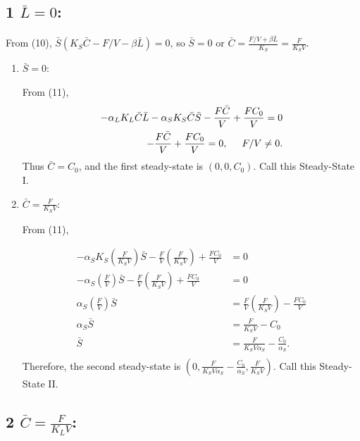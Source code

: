 \subsection*{1  $\bar{L} = 0$:}

  From (10), $\bar{S}(K_S \bar{C} - F/V - \beta \bar{L}) = 0$, so $\bar{S} = 0$ or $\bar{C} = \frac{F/V + \beta \bar{L}}{K_S} = \frac{F}{K_S V}$.
  
  \begin{enumerate}

    \item $\bar{S} = 0$:
      
    From (11), 
    \begin{align*}
      -\alpha_L K_L \bar{C}\bar{L} -\alpha_S K_S \bar{C}\bar{S} - \frac{F\bar{C}}{V} + \frac{FC_0}{V} = 0 \\
      -\frac{F\bar{C}}{V} + \frac{FC_0}{V} = 0, \hspace{5mm} F/V \neq 0.
    \end{align*}
    Thus $\bar{C} = C_0$, and the first steady-state is {\color{red}$(0,0,C_0)$}.  Call this {\color{red}Steady-State I}.

    \item $\bar{C} = \frac{F}{K_S V}$:

    From (11), 
    
    \begin{align*}
      -\alpha_S K_S \left( \frac{F}{K_S V} \right) \bar{S} - \frac{F}{V} \left( \frac{F}{K_S V} \right) + \frac{FC_0}{V} &= 0 \\
      -\alpha_S \left( \frac{F}{V} \right) \bar{S} - \frac{F}{V} \left( \frac{F}{K_S V} \right) + \frac{FC_0}{V} &= 0 \\
      \alpha_S \left( \frac{F}{V} \right) \bar{S} &= \frac{F}{V} \left( \frac{F}{K_S V} \right) - \frac{FC_0}{V} \\
      \alpha_S \bar{S} &= \frac{F}{K_S V} - C_0 \\
      \bar{S} &= \frac{F}{K_S V \alpha_S} - \frac{C_0}{\alpha_S}. \\
    \end{align*}
    Therefore, the second steady-state is {\color{red}$\left(0, \frac{F}{K_S V \alpha_S} - \frac{C_0}{\alpha_S}, \frac{F}{K_S V} \right)$}.  Call this {\color{red}Steady-State II}. 
  \end{enumerate}

\subsection*{2  $\bar{C} = \frac{F}{K_L V}$:}

